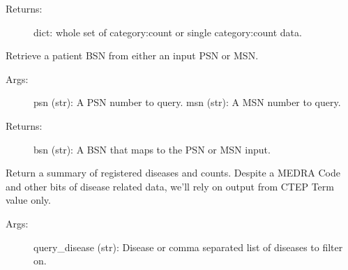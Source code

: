 \documentclass[letterpaper,10pt,english]{sphinxmanual}
\begin{document}
\begin{fulllineitems}
\begin{fulllineitems}
\begin{description}
\begin{description}
\end{description}

\item[{Returns:}] \leavevmode
dict: whole set of category:count or single category:count data.

\end{description}

\end{fulllineitems}


\begin{fulllineitems}
\label{\detokenize{matchbox_api_utils:matchbox_api_utils.MatchData.get_bsn}}
Retrieve a patient BSN from either an input PSN or MSN.
\begin{description}
\item[{Args:}] \leavevmode
psn (str): A PSN number to query.
msn (str): A MSN number to query.

\item[{Returns:}] \leavevmode
bsn (str): A BSN that maps to the PSN or MSN input.

\end{description}

\begin{sphinxVerbatim}[commandchars=\\\{\}]
\end{sphinxVerbatim}

\end{fulllineitems}


\begin{fulllineitems}
\label{\detokenize{matchbox_api_utils:matchbox_api_utils.MatchData.get_disease_summary}}
Return a summary of registered diseases and counts. Despite a MEDRA Code and other bits
of disease related data, we’ll rely on output from CTEP Term value only.
\begin{description}
\item[{Args:}] \leavevmode
query\_disease (str): Disease or comma separated list of diseases to filter on.


\end{description}
\end{fulllineitems}
\end{fulllineitems}
\end{document}
